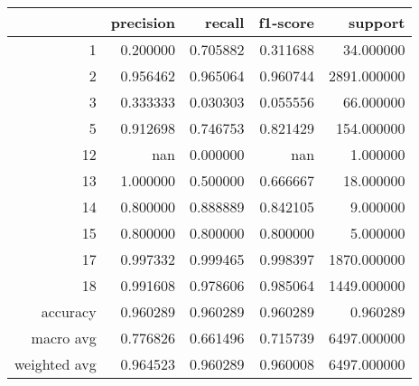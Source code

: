 \begin{table}[h]
\centering
\label{table:5}
\begin{tabular}{rrrrr}
\toprule
 & precision & recall & f1-score & support \\
\midrule
1 & 0.200000 & 0.705882 & 0.311688 & 34.000000 \\
2 & 0.956462 & 0.965064 & 0.960744 & 2891.000000 \\
3 & 0.333333 & 0.030303 & 0.055556 & 66.000000 \\
5 & 0.912698 & 0.746753 & 0.821429 & 154.000000 \\
12 & nan & 0.000000 & nan & 1.000000 \\
13 & 1.000000 & 0.500000 & 0.666667 & 18.000000 \\
14 & 0.800000 & 0.888889 & 0.842105 & 9.000000 \\
15 & 0.800000 & 0.800000 & 0.800000 & 5.000000 \\
17 & 0.997332 & 0.999465 & 0.998397 & 1870.000000 \\
18 & 0.991608 & 0.978606 & 0.985064 & 1449.000000 \\
accuracy & 0.960289 & 0.960289 & 0.960289 & 0.960289 \\
macro avg & 0.776826 & 0.661496 & 0.715739 & 6497.000000 \\
weighted avg & 0.964523 & 0.960289 & 0.960008 & 6497.000000 \\
\bottomrule
\end{tabular}
\end{table}
